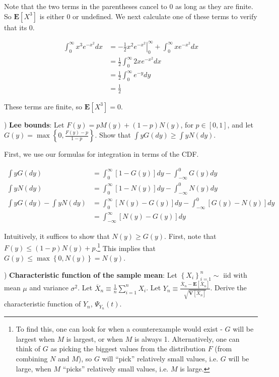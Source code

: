 \documentclass[12pt,english]{article}
\begin{document}
Note that the two terms in the parentheses cancel to 0 as long as they are finite. So $\mathbf{E}[X^{3}]$ is either 0 or undefined. We next calculate one of these terms to verify that its 0.

\begin{align*}
\int_{0}^{\infty} x^{3} e^{-x^{2}} dx & = \left. -\frac{1}{2} x^{2} e^{-x^{2}} \right|_{0}^{\infty} + \int_{0}^{\infty} x e^{-x^{2}} dx \\
& = \frac{1}{2} \int_{0}^{\infty} 2x e^{-x^{2}} dx \\
& = \frac{1}{2} \int_{0}^{\infty} e^{-y} dy \\
& = \frac{1}{2}
\end{align*}

These terms are finite, so $\mathbf{E}[X^{3}] = 0$.

\vspace{1em}
) \textbf{Lee bounds}: Let $F(y) = pM(y) + (1 - p)N(y)$, for $p \in [0, 1]$, and let $G(y) = \max \left\{ 0, \frac{F(y) - p}{1 - p} \right\}$. Show that $\int y G(dy) \geq \int y N(dy)$.
\vspace{1em}

First, we use our formulas for integration in terms of the CDF.

\begin{align*}
\int y G(dy) & = \int_{0}^{\infty} [1 - G(y)] dy - \int_{-\infty}^{0} G(y) dy \\
\int y N(dy) & = \int_{0}^{\infty} [1 - N(y)] dy - \int_{-\infty}^{0} N(y) dy \\
\int y G(dy) - \int y N(dy) & = \int_{0}^{\infty} [N(y) - G(y)] dy - \int_{-\infty}^{0} [G(y) - N(y)] dy \\
& = \int_{-\infty}^{\infty} [N(y) - G(y)] dy
\end{align*}

Intuitively, it suffices to show that $N(y) \geq G(y)$. First, note that $F(y) \leq (1 - p) N(y) + p$.\footnote{To find this, one can look for when a counterexample would exist - $G$ will be largest when $M$ is largest, or when $M$ is always 1. Alternatively, one can think of $G$ as picking the biggest values from the distribution $F$ (from combining $N$ and $M$), so $G$ will ``pick'' relatively small values, i.e. $G$ will be large, when $M$ ``picks'' relatively small values, i.e. $M$ is large.} This implies that $G(y) \leq \max \left\{ 0, N(y) \right\} = N(y)$.


\vspace{1em}
) \textbf{Characteristic function of the sample mean}: Let $\left\{ X_{i} \right\}_{i=1}^{n} \sim$ iid with mean $\mu$ and variance $\sigma^{2}$. Let $\overline{X}_{n} \equiv \frac{1}{n} \sum_{i=1}^{n} X_{i}$. Let $Y_{n} \equiv \frac{\overline{X}_{n} - \mathbf{E} \left[\overline{X}_{n} \right]}{\sqrt{\mathbf{V} \left[ \overline{X}_{n} \right]}}$. Derive the characteristic function of $Y_{n}$, $\Psi_{Y_{n}}(t)$.
\end{document}
